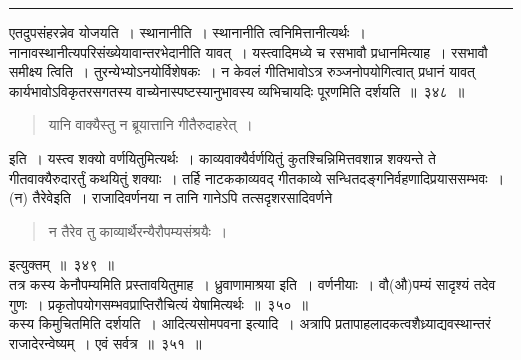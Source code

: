 \documentclass[11pt, openany]{book}
\begin{document}
\hrule

\vspace{2mm}
एतदुपसंहरन्नेव योजयति~। {\qtt स्थानानीति~। स्थानानीति} त्वनिमित्तानीत्यर्थः~। नानावस्थानीत्यपरिसंख्येयावान्तरभेदानीति यावत्~। यस्त्वादिमध्ये च रसभावौ प्रधानमित्याह~। रसभावौ समीक्ष्य त्विति~। तुरन्येभ्योऽनयोर्विशेषकः~। न केवलं गीतिभावोऽत्र रुञ्जनोपयोगित्वात् प्रधानं यावत् कार्यभावोऽविकृतरसगतस्य वाच्येनास्पष्टस्यानुभावस्य व्यभिचायदिः पूरणमिति दर्शयति~॥~३४८~॥

\begin{quote}
{\qt यानि वाक्यैस्तु न ब्रूयात्तानि गीतैरुदाहरेत्~।}
\end{quote}

\noindent
इति~। यस्त्व शक्यो वर्णयितुमित्यर्थः~। काव्यवाक्यैर्वर्णयितुं कुतश्चिन्निमित्तवशान्न शक्यन्ते ते गीतवाक्यैरुदारर्तुं कथयितुं शक्याः~। तर्हि नाटककाव्यवद् गीतकाव्ये सन्धितदङ्गनिर्वहणादिप्रयाससम्भवः~।(न) {\qtt तैरेवेइति}~। राजादिवर्णनया न तानि गानेऽपि तत्सदृशरसादिवर्णने 

\begin{quote}
{\qt न तैरेव तु काव्यार्थैरन्यैरौपम्यसंश्रयैः~। }
\end{quote}

\noindent
इत्युक्तम्~॥~३४९~॥\\

तत्र कस्य केनौपम्यमिति प्रस्तावयितुमाह~। {\qtt ध्रुवाणामाश्रया} इति~। वर्णनीयाः~। वौ(औ){\qtt पम्यं} सादृश्यं तदेव गुणः~। प्रकृतोपयोगसम्भवप्राप्तिरौचित्यं येषामित्यर्थः~॥~३५०~॥\\

कस्य किमुचितमिति दर्शयति~। {\qtt आदित्यसोमपवना} इत्यादि~। अत्रापि प्रतापाहलादकत्वशैध्र्याद्यवस्थान्तरं राजादेरन्वेष्यम्~। एवं सर्वत्र~॥~३५१~॥

\newpage
\end{document}
